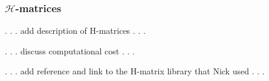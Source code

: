 \documentclass[10pt,final,xcolor=dvipsnames]{beamer}
\newcommand{\bs}[1]{\ensuremath{\boldsymbol{#1}}}
\begin{document}
\begin{frame}
  \frametitle{$\mathcal{H}$-matrices}

  . . . add description of H-matrices . . .

  . . . discuss computational cost . . .

  . . . add reference and link to the H-matrix library that Nick used . . .
  

\end{frame}
\end{document}
